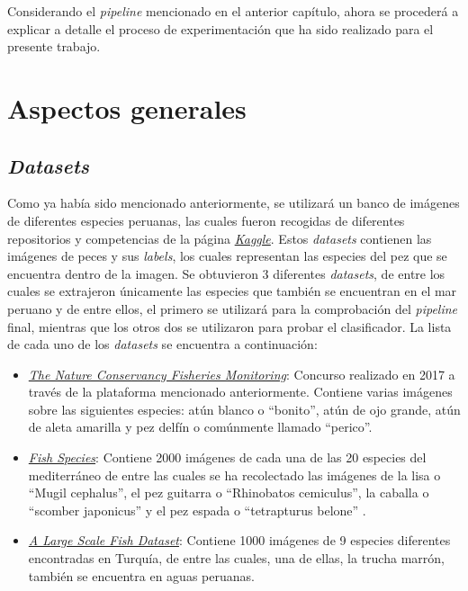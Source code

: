 Considerando el \textit{pipeline} mencionado en el anterior capítulo, ahora se procederá a explicar a detalle el proceso de experimentación que ha sido realizado para el presente trabajo.

\section{Aspectos generales}
\subsection{\textit{Datasets}}
Como ya había sido mencionado anteriormente, se utilizará un banco de imágenes de diferentes especies peruanas, las cuales fueron recogidas de  diferentes repositorios y competencias de la página \href{https://www.kaggle.com/}{\textit{Kaggle}}. Estos \textit{datasets}  contienen las imágenes de peces y sus \textit{labels}, los cuales representan las especies del pez que se encuentra dentro de la imagen. Se obtuvieron 3 diferentes \textit{datasets}, de entre los cuales se extrajeron únicamente las especies que también se encuentran en el mar peruano y de entre ellos, el primero se utilizará para la comprobación del \textit{pipeline} final, mientras que los otros dos se utilizaron para probar el clasificador. La lista de cada uno de los \textit{datasets} se encuentra a continuación:
\begin{itemize}
    \item \href{https://www.kaggle.com/c/the-nature-conservancy-fisheries-monitoring}{\textit{The Nature Conservancy Fisheries Monitoring}}: Concurso realizado en 2017 a través de la plataforma mencionado anteriormente. Contiene varias imágenes sobre las siguientes especies: atún blanco o ``bonito'', atún de ojo grande, atún de aleta amarilla y pez delfín o comúnmente llamado ``perico''.
    \item \href{https://www.kaggle.com/datasets/giannisgeorgiou/fish-species}{\textit{Fish Species}}: Contiene 2000 imágenes de cada una de las 20 especies del mediterráneo de entre las cuales se ha recolectado las imágenes de la lisa o ``Mugil cephalus'', el pez guitarra o ``Rhinobatos cemiculus'', la caballa o ``scomber japonicus'' y el pez espada o ``tetrapturus belone'' . 
    \item \href{https://www.kaggle.com/datasets/crowww/a-large-scale-fish-dataset}{\textit{A Large Scale Fish Dataset}}: Contiene 1000 imágenes de 9 especies diferentes encontradas en Turquía, de entre las cuales, una de ellas, la trucha marrón, también se encuentra en aguas peruanas. 
\end{itemize}

